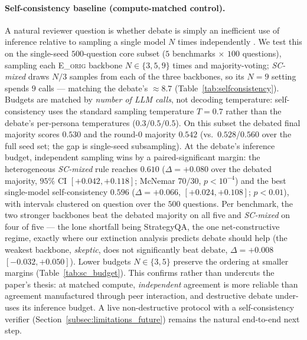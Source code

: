 \paragraph{Self-consistency baseline (compute-matched control).}
\label{par:selfconsistency}
A natural reviewer question is whether debate is simply an inefficient use of inference relative to sampling a
single model $N$ times independently \cite{wang2023selfconsistency}. We test this on the single-seed
$500$-question core subset ($5$ benchmarks $\times$ $100$ questions), sampling each \textsc{E\_orig} backbone
$N\in\{3,5,9\}$ times and majority-voting; \emph{SC-mixed} draws $N/3$ samples from each of the three
backbones, so its $N=9$ setting spends $9$ calls --- matching the debate's $\approx\!8.7$
(Table~\ref{tab:selfconsistency}). Budgets are matched by \emph{number of LLM calls}, not decoding
temperature: self-consistency uses the standard sampling temperature $T=0.7$ \cite{wang2023selfconsistency}
rather than the debate's per-persona temperatures ($0.3/0.5/0.5$). On this subset the debated final majority
scores $0.530$ and the round-$0$ majority $0.542$ (vs.\ $0.528$/$0.560$ over the full seed set; the gap is
single-seed subsampling). At the debate's inference budget, independent sampling wins by a paired-significant
margin: the heterogeneous \emph{SC-mixed} rule reaches $0.610$ ($\Delta=+0.080$ over the debated majority,
$95\%$ CI $[+0.042,+0.118]$; McNemar $70/30$, $p<10^{-4}$) and the best single-model self-consistency $0.596$
($\Delta=+0.066$, $[+0.024,+0.108]$; $p<0.01$), with intervals clustered on question over the $500$ questions.
Per benchmark, the two stronger backbones beat the debated majority on all five and \emph{SC-mixed} on four of
five --- the lone shortfall being StrategyQA, the one net-constructive regime, exactly where our extinction
analysis predicts debate should help (the weakest backbone, \emph{skeptic}, does not significantly beat
debate, $\Delta=+0.008$ $[-0.032,+0.050]$). Lower budgets $N\in\{3,5\}$ preserve the ordering at smaller
margins (Table~\ref{tab:sc_budget}). This confirms rather than undercuts the paper's thesis: at matched
compute, \emph{independent} agreement is more reliable than agreement manufactured through peer interaction,
and destructive debate under-uses its inference budget. A live non-destructive protocol with a
self-consistency verifier (Section~\ref{subsec:limitations_future}) remains the natural end-to-end next step.

